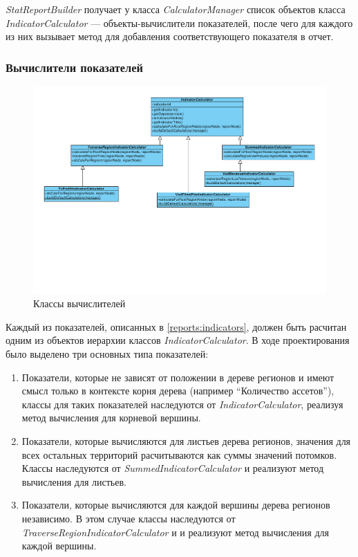 \textit{StatReportBuilder} получает у класса \textit{CalculatorManager} список объектов
класса \textit{IndicatorCalculator} --- объекты-вычислители показателей, после чего
для каждого из них вызывает метод для добавления соответствующего показателя в отчет.

\subsubsection{Вычислители показателей}
\begin{figure}[!ht]
\begin{center}
\vspace{-0.4cm}
\includegraphics[scale=0.60, trim=00mm 80mm 00mm 10mm, clip]{../resources/uml/StatReportIndicatorCalculator.pdf}
\caption{Классы вычислителей}
\label{gr:report_creation}
\end{center} 
\end{figure}

Каждый из показателей, описанных в \ref{reports:indicators}, должен быть расчитан одним из объектов
иерархии классов \textit{IndicatorCalculator}. В ходе проектирования было выделено три основных типа
показателей:
\begin{enumerate}
\item{
  Показатели, которые не зависят от положении в дереве регионов и имеют смысл только в 
контексте корня дерева (например ``Количество ассетов''), классы для таких показателей
наследуются от \textit{IndicatorCalculator}, реализуя метод вычисления для корневой вершины. 
}
\item{
  Показатели, которые вычисляются для листьев дерева регионов, значения для всех остальных территорий
расчитываются как суммы значений потомков. Классы наследуются от \textit{SummedIndicatorCalculator}
и реализуют метод вычисления для листьев.
}
\item{
  Показатели, которые вычисляются для каждой вершины дерева регионов независимо.
В этом случае классы наследуются от \textit{TraverseRegionIndicatorCalculator} и 
и реализуют метод вычисления для каждой вершины.
}
\end{enumerate}

